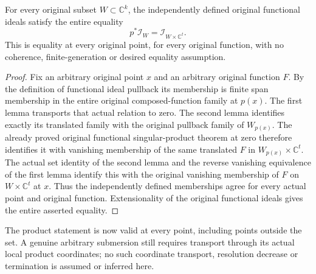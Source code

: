 \begin{theorem}
\label{hir:actual-cylinder-functional-pullback-all-points}
\leanok
For every original subset $W\subset\mathbb C^k$, the independently
defined original functional ideals satisfy the entire equality
\[
 p^*\mathcal I_W=\mathcal I_{W\times\mathbb C^t}.
\]
This is equality at every original point, for every original function,
with no coherence, finite-generation or desired equality assumption.
\end{theorem}
\begin{proof}
Fix an arbitrary original point $x$ and an arbitrary original function
$F$. By the definition of functional ideal pullback its membership is
finite span membership in the entire original composed-function family
at $p(x)$. The first lemma transports that actual relation to zero.
The second lemma identifies exactly its translated family with the
original pullback family of $W_{p(x)}$. The already proved original
functional singular-product theorem at zero therefore identifies it
with vanishing membership of the same translated $F$ in
$W_{p(x)}\times\mathbb C^t$. The actual set identity of the second
lemma and the reverse vanishing equivalence of the first lemma
identify this with the original vanishing membership of $F$ on
$W\times\mathbb C^t$ at $x$. Thus the independently defined
memberships agree for every actual point and original function.
Extensionality of the original functional ideals gives the entire
asserted equality.
\end{proof}

The product statement is now valid at every point, including points
outside the set. A genuine arbitrary submersion still requires transport
through its actual local product coordinates; no such coordinate
transport, resolution decrease or termination is assumed or inferred here.
